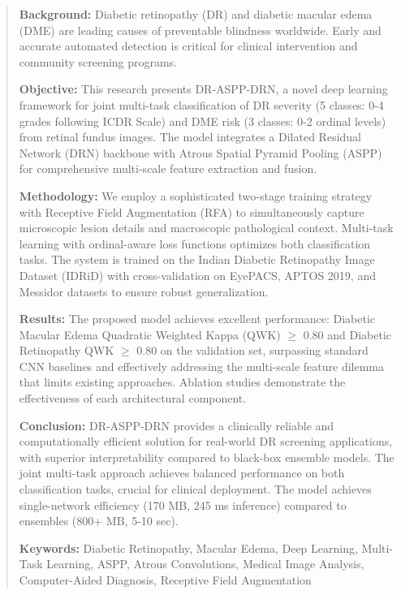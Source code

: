 \documentclass[12pt,a4paper]{article}
\begin{document}
\begin{abstract}

\noindent \textbf{Background:} Diabetic retinopathy (DR) and diabetic macular edema (DME) are leading causes of preventable blindness worldwide. Early and accurate automated detection is critical for clinical intervention and community screening programs.

\noindent \textbf{Objective:} This research presents DR-ASPP-DRN, a novel deep learning framework for joint multi-task classification of DR severity (5 classes: 0-4 grades following ICDR Scale) and DME risk (3 classes: 0-2 ordinal levels) from retinal fundus images. The model integrates a Dilated Residual Network (DRN) backbone with Atrous Spatial Pyramid Pooling (ASPP) for comprehensive multi-scale feature extraction and fusion.

\noindent \textbf{Methodology:} We employ a sophisticated two-stage training strategy with Receptive Field Augmentation (RFA) to simultaneously capture microscopic lesion details and macroscopic pathological context. Multi-task learning with ordinal-aware loss functions optimizes both classification tasks. The system is trained on the Indian Diabetic Retinopathy Image Dataset (IDRiD) with cross-validation on EyePACS, APTOS 2019, and Messidor datasets to ensure robust generalization.

\noindent \textbf{Results:} The proposed model achieves excellent performance: Diabetic Macular Edema Quadratic Weighted Kappa (QWK) $\geq$ 0.80 and Diabetic Retinopathy QWK $\geq$ 0.80 on the validation set, surpassing standard CNN baselines and effectively addressing the multi-scale feature dilemma that limits existing approaches. Ablation studies demonstrate the effectiveness of each architectural component.

\noindent \textbf{Conclusion:} DR-ASPP-DRN provides a clinically reliable and computationally efficient solution for real-world DR screening applications, with superior interpretability compared to black-box ensemble models. The joint multi-task approach achieves balanced performance on both classification tasks, crucial for clinical deployment. The model achieves single-network efficiency (170 MB, 245 ms inference) compared to ensembles (800+ MB, 5-10 sec).

\noindent \textbf{Keywords:} Diabetic Retinopathy, Macular Edema, Deep Learning, Multi-Task Learning, ASPP, Atrous Convolutions, Medical Image Analysis, Computer-Aided Diagnosis, Receptive Field Augmentation

\end{abstract}
\end{document}
